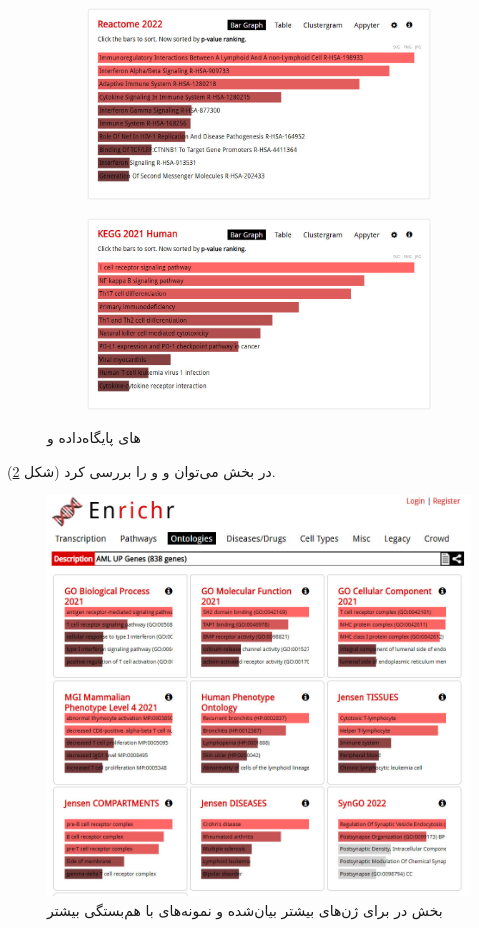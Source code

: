 \documentclass{article}
\begin{document}
\begin{figure}[h!]
	\begin{subfigure}{.5\columnwidth}
		\centering
		\includegraphics[width=\columnwidth]{figs/enrichr-pathways-reactome-2.jpg}
	\end{subfigure}
	\begin{subfigure}{.5\columnwidth}
		\centering
		\includegraphics[width=\columnwidth]{figs/enrichr-pathways-kegg-2.jpg}
	\end{subfigure}
	\caption{های پایگاه‌داده  و }
	\label{fig:enrichr-pathways-reactome-kegg}
\end{figure}

در بخش  می‌توان  و  و  را بررسی کرد (شکل \ref{fig:enrichr-ontology-2}).
\begin{figure}[h!]
	\centering
	\includegraphics[width=0.5\columnwidth]{figs/enrichr-ontologies-2.jpg}
	\caption{بخش  در  برای ژن‌های بیشتر بیان‌شده و نمونه‌های با هم‌بستگی بیشتر}
	\label{fig:enrichr-ontology-2}
\end{figure}
\end{document}
